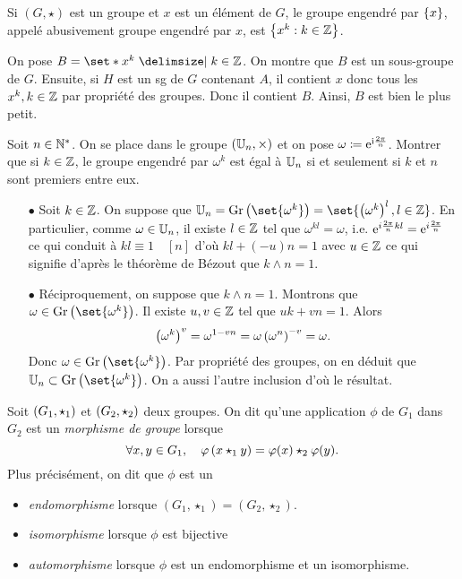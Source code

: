 \documentclass{magnolia}
\begin{document}
\begin{remarqueUnique}
\remarque Si $(G,\star)$ est un groupe et $x$ est un élément de $G$, le
  groupe engendré par $\left\{x\right\}$, appelé abusivement groupe engendré par $x$,
  est $\left\{x^k : k\in\mathbb{Z}\right\}$.
\end{remarqueUnique}
\begin{sol}
On pose $B=\enstq{x^k}{k\in\Z}$. On montre que $B$ est un sous-groupe de $G$. Ensuite, si $H$ est un sg de $G$ contenant $A$, il contient $x$ donc tous les $x^k, k\in \mathbb{Z}$ par propriété des groupes. Donc il contient $B$. Ainsi, $B$ est bien le plus petit.
\end{sol}

\begin{exoUnique}
\exo Soit $n\in{\mathbb{N}^*}$. On se place dans le groupe $(\U[n],\times)$ et on pose $\omega\coloneqq{\rm e}^{{\rm i}\frac{2\pi}{n}}$. Montrer que si $k\in\mathbb{Z}$, le groupe engendré par
  $\omega^k$ est égal à $\U[n]$ si et seulement si $k$ et $n$ sont premiers
  entre eux.
\end{exoUnique}

\begin{sol}
\begin{itemize}
$\U[n]=\set{\omega^r, r\in \Z}=\set{\omega^r, r\in \intere{0}{n-1}}$
\item[$\bullet$] Soit $k\in\mathbb{Z}$. On suppose que $\U[n]={\rm Gr}\p{\set{\omega^k}}=\set{\p{\omega^k}^l, l\in\Z}$. En particulier, comme $\omega \in \U[n]$, il existe $l\in\mathbb{Z}$ tel que $\omega^{kl}=\omega$, i.e. ${\rm e}^{i\frac{2\pi}{n}kl}={\rm e}^{i\frac{2\pi}{n}}$ ce qui conduit à $kl\equiv 1\quad [n]$ d'où $kl+(-u)n=1$ avec $u\in \mathbb{Z}$ ce qui signifie d'après le théorème de Bézout que $k\wedge n=1$.
\item[$\bullet$] Réciproquement, on suppose que $k\wedge n=1$. Montrons que $\omega \in {\rm Gr}\p{\set{\omega^k}}$. Il existe $u,v \in \mathbb{Z}$ tel que $uk+vn=1$. Alors $$\left(\omega^k\right)^v=\omega^{1-vn}=\omega \left(\omega^n\right)^{-v}=\omega.$$ Donc $\omega \in {\rm Gr}\p{\set{\omega^k}}$. Par propriété des groupes, on en déduit que $\U[n]\subset {\rm Gr}\p{\set{\omega^k}}$. On a aussi l'autre inclusion d'où le résultat.
\end{itemize}
\end{sol}

\begin{definition}
Soit $\left(G_1,\star_1\right)$ et $\left(G_2,\star_2\right)$ deux groupes. On dit qu'une
application $\phi$ de $G_1$ dans $G_2$ est un \emph{morphisme de groupe} lorsque
\[\forall x,y\in G_1 ,\quad \varphi\left(x\star_1 y\right)=\varphi(x)\star_2\varphi(y).\]
Plus précisément, on dit que $\phi$ est un
\begin{itemize}
\item \emph{endomorphisme} lorsque $(G_1,\star_1)=(G_2,\star_2)$.
\item \emph{isomorphisme} lorsque $\phi$ est bijective
\item \emph{automorphisme} lorsque $\phi$ est un endomorphisme et un isomorphisme.
\end{itemize}
\end{definition}
\end{document}
